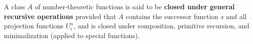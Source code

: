 A class $A$ of number-theoretic functions is said to be \textbf{closed under general recursive operations} provided that $A$ contains the successor function $s$ and all projection functions $U_i^n$, and is closed under composition, primitive recursion, and minimalization (applied to special functions).
